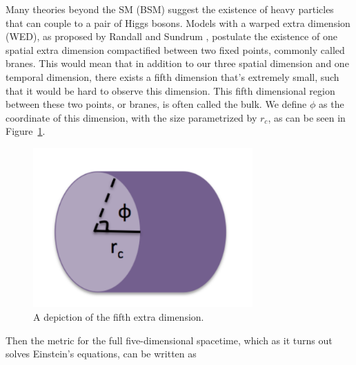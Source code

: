 
\vspace{10mm}
\ifdefined{}\else{}\fi

Many theories beyond the SM (BSM) suggest \ifdefined{}\else{ } \fi the existence of heavy particles that can couple to a pair of Higgs bosons. 
Models with a warped extra dimension (WED), as proposed by Randall and Sundrum \cite{Randall:1999ee}, postulate the existence of one spatial extra dimension compactified between two fixed points, commonly called branes. This would mean that in addition to our three spatial dimension and one temporal dimension, there exists a fifth dimension that's extremely small, such that it would be hard to observe this dimension. This fifth dimensional region between these two points, or branes, is often called the bulk. We define $\phi$ as the coordinate of this dimension, with the size parametrized by $r_{c}$, as can be seen in Figure~\ref{Fig:Theory:RSdimension}. 
\begin{figure}
    \centering
        \includegraphics[width=0.75\textwidth]{F2/RSdimension.pdf}
        \caption{A depiction of the fifth extra dimension.}
        \label{Fig:Theory:RSdimension}
\end{figure}
Then the metric for the full five-dimensional spacetime, which as it turns out solves Einstein's equations, can be written as 
